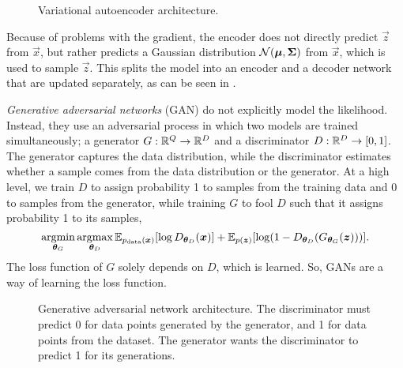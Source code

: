\begin{figure}[ht]
    \centering
    \caption{Variational autoencoder architecture.}
    \label{fig:variational-autoencoder}
\end{figure}

Because of problems with the gradient, the encoder does not directly predict
$\vec{z}$ from $\vec{x}$, but rather predicts a Gaussian distribution
$\mathcal{N}(\bm{\mu},\bm{\Sigma})$ from $\vec{x}$, which is used to sample
$\vec{z}$. This splits the model into an encoder and a decoder network that are
updated separately, as can be seen in .

\textit{Generative adversarial networks} (GAN) \citep{goodfellow2014generative}
do not explicitly model the likelihood. Instead, they use an adversarial
process in which two models are trained simultaneously; a generator $G:
\mathbb{R}^Q\to\mathbb{R}^D$ and a discriminator $D:\mathbb{R}^D \to [0,1]$. The generator captures the
data distribution, while the discriminator estimates whether a sample comes
from the data distribution or the generator. At a high level, we train $D$ to
assign probability 1 to samples from the training data and 0 to samples from
the generator, while training $G$ to fool $D$ such that it assigns probability
1 to its samples, \[
  \argmin_{\vec{\theta}_G}\argmax_{\vec{\theta}_D} \E_{p_{\text{data}}(\bm{x})}[\log D_{\vec{\theta}_D}(\vec{x})] + \E_{p(\vec{z})} \lft[ \log (1-D_{\vec{\theta}_D}(G_{\vec{\theta}_G}(\vec{z}))) \rgt]
.\]
The loss function of $G$ solely depends on $D$, which is learned. So, GANs
are a way of learning the loss function.

\begin{figure}[ht]
    \centering
    \caption{Generative adversarial network architecture. The discriminator must
    predict 0 for data points generated by the generator, and 1 for data points
    from the dataset. The generator wants the discriminator to predict 1 for its
    generations.}
    \label{fig:gan}
\end{figure}
